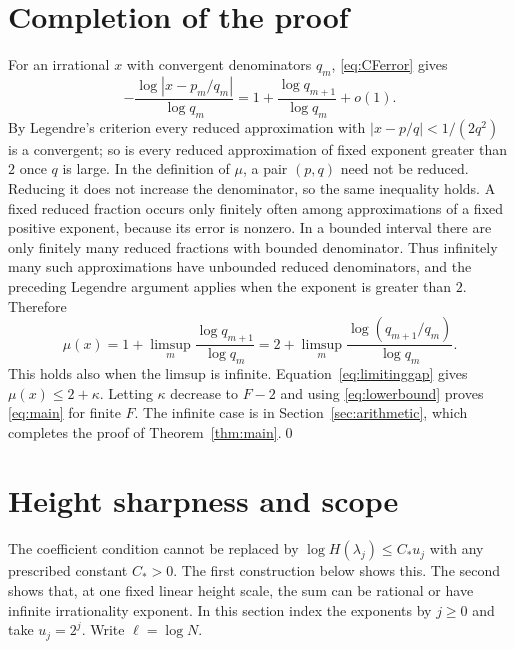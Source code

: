 \documentclass{amsart}
\numberwithin{equation}{section}
\begin{document}
\section{Completion of the proof}

For an irrational $x$ with convergent denominators $q_m$,
\eqref{eq:CFerror} gives
\[
-\frac{\log|x-p_m/q_m|}{\log q_m}
=1+\frac{\log q_{m+1}}{\log q_m}+o(1).
\]
By Legendre's criterion every reduced approximation with
$|x-p/q|<1/(2q^2)$ is a convergent; so is every reduced approximation of
fixed exponent greater than $2$ once $q$ is large.
In the definition of $\mu$, a pair $(p,q)$ need not be reduced. Reducing it does not increase the denominator, so the same inequality holds. A
fixed reduced fraction occurs only finitely often among approximations of a
fixed positive exponent, because its error is nonzero. In a bounded interval
there are only finitely many reduced fractions with bounded denominator.
Thus infinitely many such approximations have unbounded reduced
denominators, and the preceding Legendre argument applies when the
exponent is greater than $2$.
Therefore
\begin{equation}\label{eq:exponentidentity}
\mu(x)=1+\limsup_m\frac{\log q_{m+1}}{\log q_m}
=2+\limsup_m\frac{\log(q_{m+1}/q_m)}{\log q_m}.
\end{equation}
This holds also when the limsup is infinite.
Equation~\eqref{eq:limitinggap} gives $\mu(x)\le2+\kappa$.
Letting $\kappa$ decrease to $F-2$ and using
\eqref{eq:lowerbound} proves \eqref{eq:main} for finite $F$.
The infinite case is in Section~\ref{sec:arithmetic}, which completes
the proof of Theorem~\ref{thm:main}.\qed

\section{Height sharpness and scope}

The coefficient condition cannot be replaced by
$\log H(\lambda_j)\le C_*u_j$ with any prescribed constant $C_*>0$.
The first construction below shows this. The second shows that, at one
fixed linear height scale, the sum can be rational or have
infinite irrationality exponent.
In this section index the exponents by $j\ge0$ and take $u_j=2^j$.
Write $\ell=\log N$.
\end{document}
